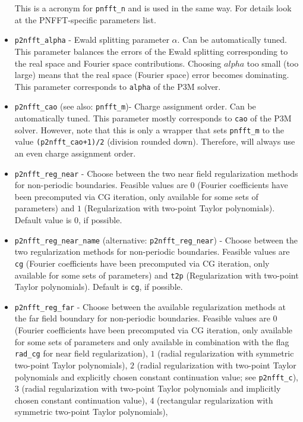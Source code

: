 \begin{itemize}
    This is a acronym for \verb!pnfft_n! and is used in the same way. For details look at the PNFFT-specific parameters list.
  \item \verb!p2nfft_alpha! -
    Ewald splitting parameter $\alpha$. Can be automatically tuned. This parameter balances the errors of the Ewald splitting corresponding to
    the real space and Fourier space contributions. Choosing $alpha$ too small (too large) means that the real space (Fourier space) error becomes dominating.
    This parameter corresponds to \verb!alpha! of the P3M solver.
  \item \verb!p2nfft_cao! (see also: \verb!pnfft_m!)-
    Charge assignment order. Can be automatically tuned. This parameter mostly corresponds to \verb!cao! of the P3M solver.
    However, note that this is only a wrapper that sets \verb!pnfft_m! to the value \verb!(p2nfft_cao+1)/2! (division rounded down).
    Therefore, \ptwonfft will always use an even charge assignment order.
  \item \verb!p2nfft_reg_near! -
    Choose between the two near field regularization methods for non-periodic boundaries. Feasible values are $0$ (Fourier coefficients have been precomputed via CG iteration, only available for some sets of parameters)
    and $1$ (Regularization with two-point Taylor polynomials). Default value is $0$, if possible.
  \item \verb!p2nfft_reg_near_name! (alternative: \verb!p2nfft_reg_near!) -
    Choose between the two regularization methods for non-periodic boundaries. Feasible values are \verb!cg! (Fourier coefficients have been precomputed via CG iteration, only available for some sets of parameters)
    and \verb!t2p! (Regularization with two-point Taylor polynomials). Default is \verb!cg!, if possible.
  \item \verb!p2nfft_reg_far! -
    Choose between the available regularization methods at the far field boundary for non-periodic boundaries.
    Feasible values are 
    $0$ (Fourier coefficients have been precomputed via CG iteration, only available for some sets of parameters and only available in combination with the flag \verb!rad_cg! for near field regularization),
    $1$ (radial regularization with symmetric two-point Taylor polynomials),
    $2$ (radial regularization with two-point Taylor polynomials and explicitly chosen constant continuation value; see \verb!p2nfft_c!),
    $3$ (radial regularization with two-point Taylor polynomials and implicitly chosen constant continuation value),
    $4$ (rectangular regularization with symmetric two-point Taylor polynomials),

\end{itemize}
